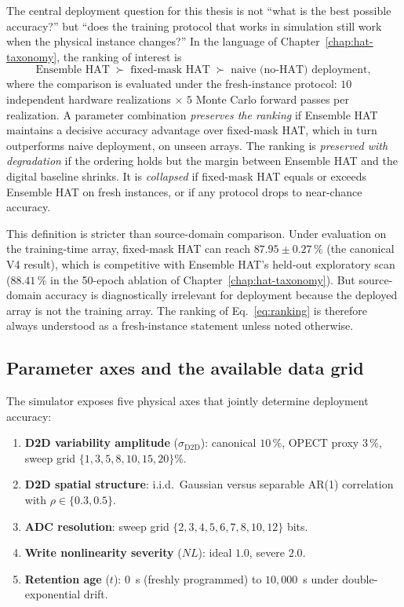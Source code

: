 The central deployment question for this thesis is not ``what is the best possible accuracy?'' but ``does the training protocol that works in simulation still work when the physical instance changes?''  In the language of Chapter~\ref{chap:hat-taxonomy}, the ranking of interest is
\begin{equation}
    \text{Ensemble HAT} \;\succ\; \text{fixed-mask HAT} \;\succ\; \text{naive (no-HAT) deployment},
    \label{eq:ranking}
\end{equation}
where the comparison is evaluated under the fresh-instance protocol: $10$ independent hardware realizations $\times$ $5$ Monte Carlo forward passes per realization.  A parameter combination \emph{preserves the ranking} if Ensemble HAT maintains a decisive accuracy advantage over fixed-mask HAT, which in turn outperforms naive deployment, on unseen arrays.  The ranking is \emph{preserved with degradation} if the ordering holds but the margin between Ensemble HAT and the digital baseline shrinks.  It is \emph{collapsed} if fixed-mask HAT equals or exceeds Ensemble HAT on fresh instances, or if any protocol drops to near-chance accuracy.

This definition is stricter than source-domain comparison.  Under evaluation on the training-time array, fixed-mask HAT can reach $87.95\pm0.27\,\%$ (the canonical V4 result), which is competitive with Ensemble HAT's held-out exploratory scan ($88.41\,\%$ in the 50-epoch ablation of Chapter~\ref{chap:hat-taxonomy}).  But source-domain accuracy is diagnostically irrelevant for deployment because the deployed array is not the training array.  The ranking of Eq.~\ref{eq:ranking} is therefore always understood as a fresh-instance statement unless noted otherwise.

\subsection{Parameter axes and the available data grid}

The simulator exposes five physical axes that jointly determine deployment accuracy:
\begin{enumerate}
    \item \textbf{D2D variability amplitude} ($\sigma_{\mathrm{D2D}}$): canonical $10\,\%$, OPECT proxy $3\,\%$, sweep grid $\{1,3,5,8,10,15,20\}\%$.
    \item \textbf{D2D spatial structure}: i.i.d.~Gaussian versus separable AR(1) correlation with $\rho \in \{0.3, 0.5\}$.
    \item \textbf{ADC resolution}: sweep grid $\{2,3,4,5,6,7,8,10,12\}$ bits.
    \item \textbf{Write nonlinearity severity} ($NL$): ideal $1.0$, severe $2.0$.
    \item \textbf{Retention age} ($t$): $0$~s (freshly programmed) to $10{,}000$~s under double-exponential drift.
\end{enumerate}

